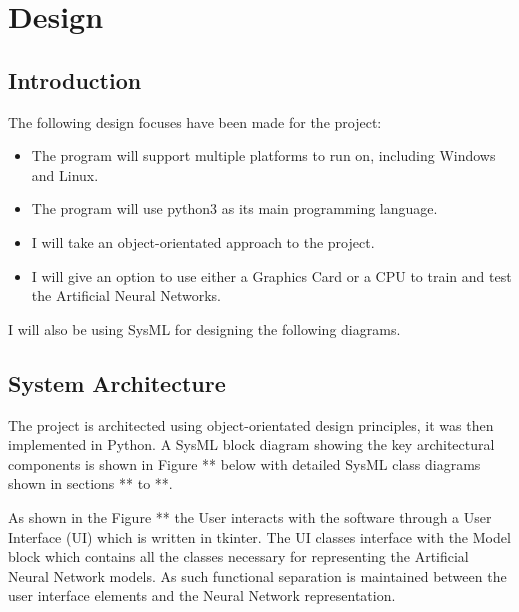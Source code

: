\documentclass[./project-report/src/latex/project-report.tex]{subfiles}
\begin{document}
\maketitle

\clearpage
\section{Design}

\subsection{Introduction}

The following design focuses have been made for the project:

\begin{itemize}
    \item The program will support multiple platforms to run on, including Windows and Linux.
    \item The program will use python3 as its main programming language.
    \item I will take an object-orientated approach to the project.
    \item I will give an option to use either a Graphics Card or a CPU to train and test the Artificial Neural Networks.
\end{itemize}

I will also be using SysML for designing the following diagrams.

\subsection{System Architecture}

The project is architected using object-orientated design principles, it was then implemented in Python. A SysML block diagram showing the key architectural components is 
shown in Figure ** below with detailed SysML class diagrams shown in sections ** to **.

As shown in the Figure ** the User interacts with the software through a User Interface (UI) which is written in tkinter. The UI classes interface with the Model block which 
contains all the classes necessary for representing the Artificial Neural Network models. As such functional separation is maintained between the user interface elements and 
the Neural Network representation.
\end{document}

